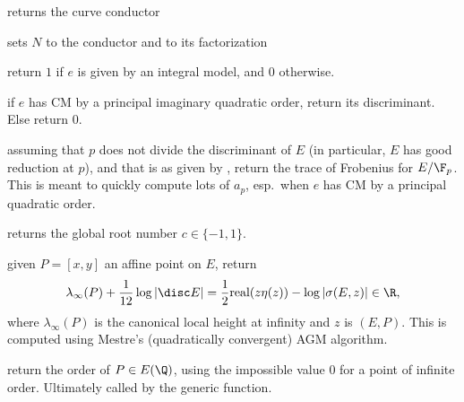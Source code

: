 














 returns the curve conductor

 sets $N$ to the conductor
and  to its factorization

 return $1$ if $e$ is given by an integral
model, and $0$ otherwise.

 if $e$ has CM by a principal imaginary
quadratic order, return its discriminant. Else return $0$.

 assuming that $p$
does not divide the discriminant of $E$ (in particular, $E$ has good
reduction at $p$), and that  is as given by ,
return the trace of Frobenius for $E/\F_p$. This is meant to quickly compute
lots of $a_p$, esp.~when $e$ has CM by a principal quadratic order.

 returns the global root number
$c\in \{-1,1\}$.

 given $P = [x,y]$ an affine
point on $E$, return
$$
\lambda_\infty(P) + \dfrac{1}{12}\log|\disc E| =
 \dfrac{1}{2} \text{real}(z\eta(z)) - \log |\sigma(E,z)|
\in \R, $$
where $\lambda_\infty(P)$ is the canonical local height at infinity
and $z$ is $(E,P)$. This
is computed using Mestre's (quadratically convergent) AGM algorithm.

 return the order of $P\in E(\Q)$, using
the impossible value $0$ for a point of infinite order. Ultimately called
by the generic  function.

